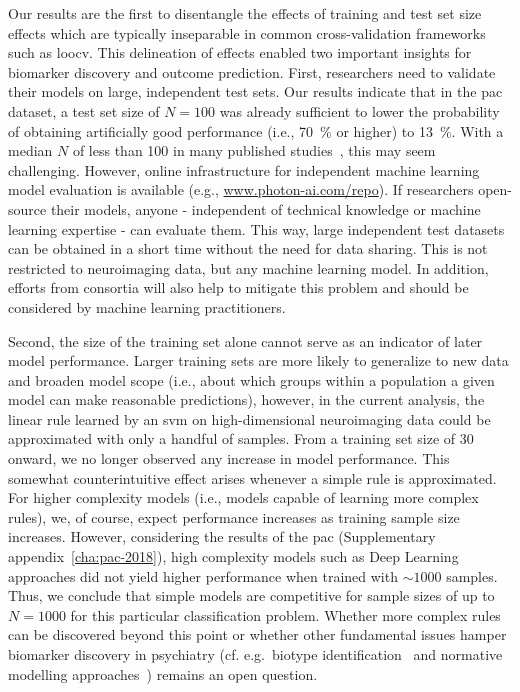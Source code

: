 \documentclass[12pt,a4paper]{article}
\begin{document}
    Our results are the first to disentangle the effects of training and test set size effects which are typically inseparable in common cross-validation frameworks such as \ac{loocv}. This delineation of effects enabled two important insights for biomarker discovery and outcome prediction. First, researchers need to validate their models on large, independent test sets. Our results indicate that in the \ac{pac} dataset, a test set size of $N=\num{100}$ was already sufficient to lower the probability of obtaining artificially good performance (i.e., \SI{70}{\percent} or higher) to \SI{13}{\percent}. With a median $N$ of less than \num{100} in many published studies~\cite{Arbabshirani2017}, this may seem challenging. However, online infrastructure for independent machine learning model evaluation is available (e.g., \url{www.photon-ai.com/repo}). If researchers open-source their models, anyone - independent of technical knowledge or machine learning expertise - can evaluate them. This way, large independent test datasets can be obtained in a short time without the need for data sharing. This is not restricted to neuroimaging data, but any machine learning model. In addition, efforts from consortia will also help to mitigate this problem and should be considered by machine learning practitioners.

Second, the size of the training set alone cannot serve as an indicator of later model performance. Larger training sets are more likely to generalize to new data and broaden model scope (i.e., about which groups within a population a given model can make reasonable predictions), however, in the current analysis, the linear rule learned by an \ac{svm} on high-dimensional neuroimaging data could be approximated with only a handful of samples. From a training set size of \num{30} onward, we no longer observed any increase in model performance. This somewhat counterintuitive effect arises whenever a simple rule is approximated. For higher complexity models (i.e., models capable of learning more complex rules), we, of course, expect performance increases as training sample size increases. However, considering the results of the \ac{pac} (Supplementary appendix~\ref{cha:pac-2018}), high complexity models such as Deep Learning approaches did not yield higher performance when trained with $\sim\num{1000}$ samples. Thus, we conclude that simple models are competitive for sample sizes of up to $N=\num{1000}$ for this particular classification problem. Whether more complex rules can be discovered beyond this point or whether other fundamental issues hamper biomarker discovery in psychiatry (cf. e.g.\ biotype identification~\cite{Kircher2018} and normative modelling approaches~\cite{Marquand2016}) remains an open question.
\end{document}
